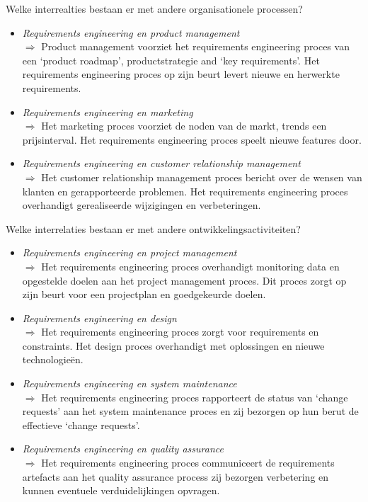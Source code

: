 \documentclass{article}
\begin{document}
\begin{quest}{}Welke interrealties bestaan er met andere organisationele processen?
\end{quest}
\begin{itemize}
\item \textit{Requirements engineering en product management}\\
$\Rightarrow$ Product management voorziet het requirements engineering proces van een `product roadmap', productstrategie and `key requirements'. Het requirements engineering proces op zijn beurt levert nieuwe en herwerkte requirements.
\item \textit{Requirements engineering en marketing}\\
$\Rightarrow$ Het marketing proces voorziet de noden van de markt, trends een prijsinterval. Het requirements engineering proces speelt nieuwe features door.
\item \textit{Requirements engineering en customer relationship management} \\
$\Rightarrow$ Het customer relationship management proces bericht over de wensen van klanten en gerapporteerde problemen. Het requirements engineering proces overhandigt gerealiseerde wijzigingen en verbeteringen.
\end{itemize}
\begin{quest}{}
Welke interrelaties bestaan er met andere ontwikkelingsactiviteiten?
\end{quest}
\begin{itemize}
\item \textit{Requirements engineering en project management} \\
$\Rightarrow$ Het requirements engineering proces overhandigt monitoring data en opgestelde doelen aan het project management proces. Dit proces zorgt op zijn beurt voor een projectplan en goedgekeurde doelen.
\item \textit{Requirements engineering en design} \\
$\Rightarrow$ Het requirements engineering proces zorgt voor requirements en constraints. Het design proces overhandigt met oplossingen en nieuwe technologie\"en.
\item \textit{Requirements engineering en system maintenance} \\
$\Rightarrow$ Het requirements engineering proces rapporteert de status van `change requests' aan het system maintenance proces en zij bezorgen op hun berut de effectieve `change requests'.
\item \textit{Requirements engineering en quality assurance} \\
$\Rightarrow$ Het requirements engineering proces communiceert de requirements artefacts aan het quality assurance process zij bezorgen verbetering en kunnen eventuele verduidelijkingen opvragen.
\end{itemize}
\end{document}
